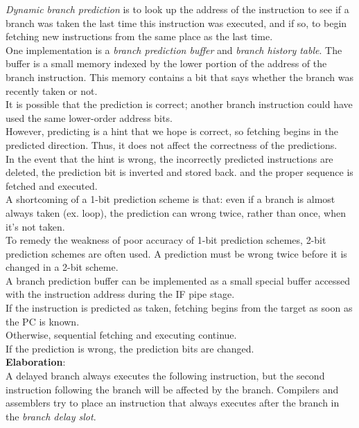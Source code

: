 \documentclass[12pt]{article}
\theoremstyle{definition}
\begin{document}
  \emph{Dynamic branch prediction} is to look up the address of the instruction to see if a branch was taken the last time this instruction was executed, and if so, to begin fetching new instructions from the same place as the last time. \\
  One implementation is a \emph{branch prediction buffer} and \emph{branch history table}.
  The buffer is a small memory indexed by the lower portion of the address of the branch instruction.
  This memory contains a bit that says whether the branch was recently taken or not. \\

  It is possible that the prediction is correct; another branch instruction could have used the same lower-order address bits. \\
  However, predicting is a hint that we hope is correct, so fetching begins in the predicted direction.
  Thus, it does not affect the correctness of the predictions. \\
  In the event that the hint is wrong, the incorrectly predicted instructions are deleted, the prediction bit is inverted and stored back. and the proper sequence is fetched and executed. \\

  A shortcoming of a 1-bit prediction scheme is that: even if a branch is almost always taken (ex. loop), the prediction can wrong twice, rather than once, when it's not taken. \\

  To remedy the weakness of poor accuracy of 1-bit prediction schemes, 2-bit prediction schemes are often used.
  A prediction must be wrong twice before it is changed in a 2-bit scheme. \\

  A branch prediction buffer can be implemented as a small special buffer accessed with the instruction address during the IF pipe stage. \\
  If the instruction is predicted as taken, fetching begins from the target as soon as the PC is known. \\
  Otherwise, sequential fetching and executing continue. \\
  If the prediction is wrong, the prediction bits are changed. \\

  \textbf{Elaboration}: \\
  A delayed branch always executes the following instruction, but the second instruction following the branch will be affected by the branch.
  Compilers and assemblers try to place an instruction that always executes after the branch in the \emph{branch delay slot}. \\
\end{document}
